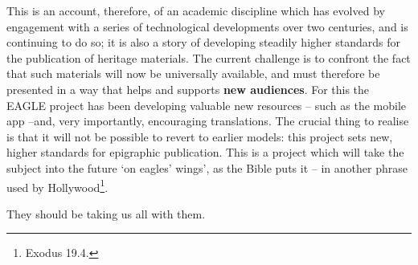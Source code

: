 \documentclass[amsthm,ebook]{saparticle}
\begin{document}
This is an account, therefore, of an academic discipline which has evolved by engagement 
with a series of technological developments over two centuries, and is continuing 
to do so; it is also a story of developing steadily higher standards for the publication 
of heritage materials. The current challenge is to confront the fact that such 
materials will now be universally available, and must therefore be presented in 
a way that helps and supports \textbf{new audiences}. For this the EAGLE project 
has been developing valuable new resources – such as the mobile app –and, very 
importantly, encouraging translations. The crucial thing to realise is that it 
will not be possible to revert to earlier models: this project sets new, higher 
standards for epigraphic publication. This is a project which will take the subject 
into the future `on eagles' wings', as the Bible puts it – in another phrase 
used by Hollywood\footnote{Exodus 19.4.}.

They should be taking us all with them.
\end{document}
